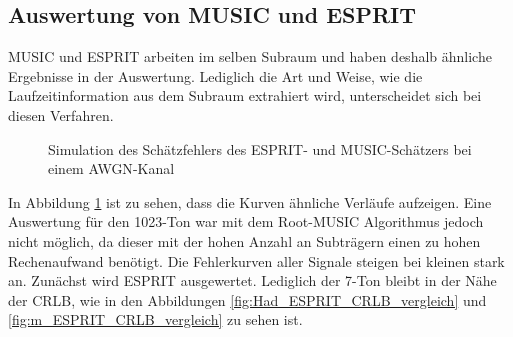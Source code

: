 \subsection{Auswertung von MUSIC und ESPRIT}
\gls{MUSIC} und \gls{ESPRIT} arbeiten im selben Subraum und haben deshalb ähnliche Ergebnisse in der Auswertung. Lediglich die Art und Weise, wie die Laufzeitinformation aus dem Subraum extrahiert wird, unterscheidet sich bei diesen Verfahren.

\begin{figure}[htbp]
	\centering
	\caption{Simulation des Schätzfehlers des \gls{ESPRIT}- und \gls{MUSIC}-Schätzers bei einem \gls{AWGN}-Kanal}
	\label{fig:ESPRIT_MUSIC_varianz}
\end{figure}

In Abbildung \ref{fig:ESPRIT_MUSIC_varianz} ist zu sehen, dass die Kurven ähnliche Verläufe aufzeigen. Eine Auswertung für den 1023-Ton  war mit dem Root-\gls{MUSIC} Algorithmus jedoch nicht möglich, da dieser mit der hohen Anzahl an Subträgern einen zu hohen Rechenaufwand benötigt. 
Die Fehlerkurven aller Signale steigen bei kleinen  stark an. Zunächst wird \gls{ESPRIT} ausgewertet.
Lediglich der 7-Ton bleibt in der Nähe der \gls{CRLB}, wie in den Abbildungen \ref{fig:Had_ESPRIT_CRLB_vergleich} und \ref{fig:m_ESPRIT_CRLB_vergleich} zu sehen ist. 

